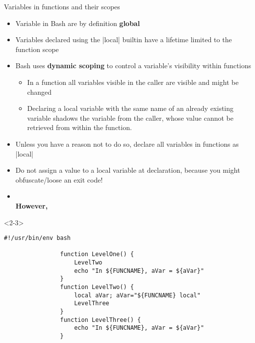 \begin{frame}[fragile]{Variables in functions and their scopes}
    \vspace{-1mm}
    \begin{overlayarea}{\textwidth}{0.7\textheight}
        \begin{itemize}
            \item<only@-5> Variable in Bash are by definition \alert{\textbf{global}}
            \item<only@-5> Variables declared using the \bash|local| builtin have a lifetime limited to the function scope
            \item<only@1,4-5> Bash uses \textbf{dynamic scoping} to control a variable's visibility within functions
                  \begin{itemize}
                      \item In a function all variables visible in the caller are visible and might be changed
                      \item Declaring a local variable with the same name of an already existing variable shadows the variable from the caller, whose value cannot be retrieved from within the function.
                  \end{itemize}
            \item<only@4-5> Unless you have a reason not to do so, declare all variables in functions as \bash|local|
            \item<only@4-5> Do not assign a value to a local variable at declaration, because you might obfuscate/loose an exit code!
            \item<only@5    > \\
                           \textbf{However,} 
        \end{itemize}
        \begin{onlyenv}<2-3>
            \begin{lstlisting}[style=MyBash, aboveskip=2mm]
                #!/usr/bin/env bash

                function LevelOne() {
                    LevelTwo
                    echo "In ${FUNCNAME}, aVar = ${aVar}"
                }
                function LevelTwo() {
                    local aVar; aVar="${FUNCNAME} local"
                    LevelThree
                }
                function LevelThree() {
                    echo "In ${FUNCNAME}, aVar = ${aVar}"
                }


\end{lstlisting}
\end{onlyenv}
\end{overlayarea}
\end{frame}

